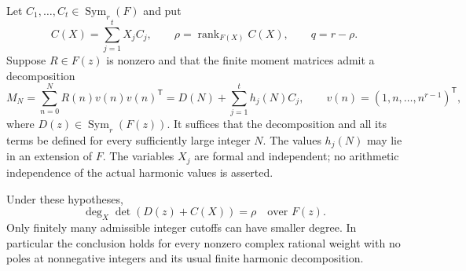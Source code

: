 Let $C_1,\ldots,C_t\in\operatorname{Sym}_r(F)$ and put
\[
 C(X)=\sum_{j=1}^tX_jC_j,\qquad
 \rho=\operatorname{rank}_{F(X)}C(X),\qquad q=r-\rho.
\]
Suppose $R\in F(z)$ is nonzero and that the finite moment matrices
admit a decomposition
\begin{equation}\label{cr:decomposition}
 M_N=\sum_{n=0}^N R(n)v(n)v(n)^{\mathsf T}
     =D(N)+\sum_{j=1}^t h_j(N)C_j,
 \qquad v(n)=(1,n,\ldots,n^{r-1})^{\mathsf T},
\end{equation}
where $D(z)\in\operatorname{Sym}_r(F(z))$.  It suffices that the
decomposition and all its terms be defined for every sufficiently
large integer $N$.  The values $h_j(N)$ may lie in an extension of
$F$.  The variables $X_j$ are formal and independent; no arithmetic
independence of the actual harmonic values is asserted.

\begin{theorem}
\label{cr:degree}
Under these hypotheses,
\begin{equation}\label{cr:main}
 \boxed{\deg_X\det(D(z)+C(X))=\rho\quad\text{over }F(z).}
\end{equation}
Only finitely many admissible integer cutoffs can have smaller
degree.  In particular the conclusion holds for every nonzero complex
rational weight with no poles at nonnegative integers and its usual
finite harmonic decomposition.
\end{theorem}
